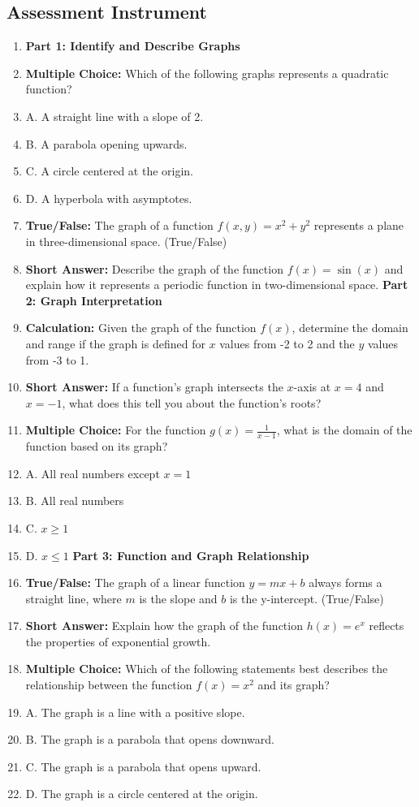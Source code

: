 \subsection{Assessment Instrument}

\begin{enumerate}
    \item \textbf{Part 1: Identify and Describe Graphs}
    \item \textbf{Multiple Choice:} Which of the following graphs represents a quadratic function?
    \item A. A straight line with a slope of 2.
    \item B. A parabola opening upwards.
    \item C. A circle centered at the origin.
    \item D. A hyperbola with asymptotes.
    \item \textbf{True/False:} The graph of a function $f(x, y) = x^2 + y^2$ represents a plane in three-dimensional space. (True/False)
    \item \textbf{Short Answer:} Describe the graph of the function $f(x) = \sin(x)$ and explain how it represents a periodic function in two-dimensional space. \textbf{Part 2: Graph Interpretation}
    \item \textbf{Calculation:} Given the graph of the function $f(x)$, determine the domain and range if the graph is defined for $x$ values from -2 to 2 and the $y$ values from -3 to 1.
    \item \textbf{Short Answer:} If a function's graph intersects the $x$-axis at $x = 4$ and $x = -1$, what does this tell you about the function's roots?
    \item \textbf{Multiple Choice:} For the function $g(x) = \frac{1}{x-1}$, what is the domain of the function based on its graph?
    \item A. All real numbers except $x = 1$
    \item B. All real numbers
    \item C. $x \geq 1$
    \item D. $x \leq 1$ \textbf{Part 3: Function and Graph Relationship}
    \item \textbf{True/False:} The graph of a linear function $y = mx + b$ always forms a straight line, where $m$ is the slope and $b$ is the y-intercept. (True/False)
    \item \textbf{Short Answer:} Explain how the graph of the function $h(x) = e^x$ reflects the properties of exponential growth.
    \item \textbf{Multiple Choice:} Which of the following statements best describes the relationship between the function $f(x) = x^2$ and its graph?
    \item A. The graph is a line with a positive slope.
    \item B. The graph is a parabola that opens downward.
    \item C. The graph is a parabola that opens upward.
    \item D. The graph is a circle centered at the origin.
\end{enumerate}

